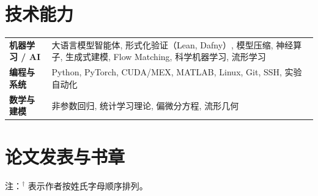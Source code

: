 \documentclass[11pt]{ctexart}
\begin{document}
\section*{技术能力}
{\small
\begin{tabular}{@{}>{\bfseries}p{2.7cm}p{11.8cm}@{}}
机器学习 / AI & 大语言模型智能体, 形式化验证（Lean, Dafny）, 模型压缩, 神经算子, 生成式建模, Flow Matching, 科学机器学习, 流形学习 \\
编程与系统 & Python, PyTorch, CUDA/MEX, MATLAB, Linux, Git, SSH, 实验自动化 \\
数学与建模 & 非参数回归, 统计学习理论, 偏微分方程, 流形几何 \\
\end{tabular}
}

\section*{论文发表与书章}
{\footnotesize 注：$^\dagger$ 表示作者按姓氏字母顺序排列。}
\end{document}
